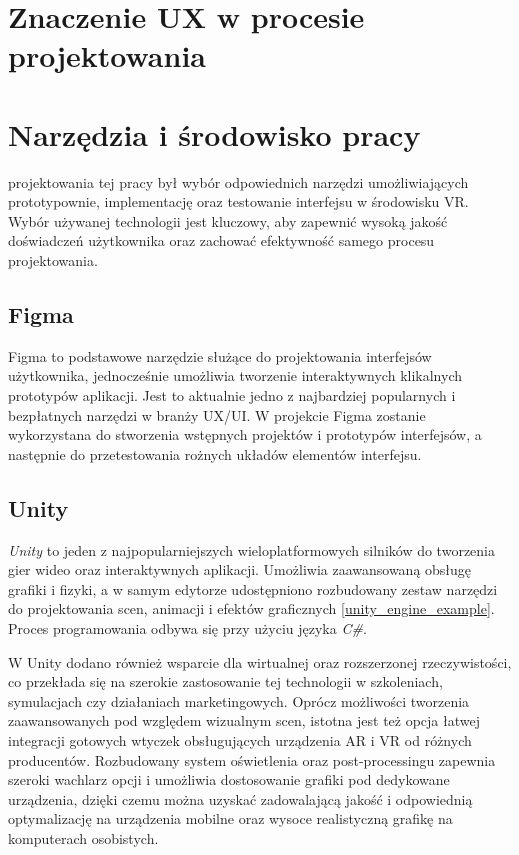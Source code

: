  \section{Znaczenie UX w procesie projektowania}
 



\section {Narzędzia i środowisko pracy}


 projektowania tej pracy był wybór odpowiednich narzędzi umożliwiających prototypownie, implementację oraz testowanie interfejsu w środowisku VR. Wybór używanej technologii jest kluczowy, aby zapewnić wysoką jakość doświadczeń użytkownika oraz zachować efektywność samego procesu projektowania.

\subsection{Figma}
Figma to podstawowe narzędzie służące do projektowania interfejsów użytkownika, jednocześnie umożliwia tworzenie interaktywnych klikalnych prototypów aplikacji. Jest to aktualnie jedno z najbardziej popularnych i bezpłatnych narzędzi w branży UX/UI. W projekcie Figma zostanie wykorzystana do stworzenia wstępnych projektów i prototypów interfejsów, a następnie do przetestowania rożnych układów elementów interfejsu. 
\subsection{Unity}
\textit{Unity} to jeden z najpopularniejszych wieloplatformowych silników do tworzenia gier wideo oraz interaktywnych aplikacji. Umożliwia zaawansowaną obsługę grafiki i fizyki, a w samym edytorze udostępniono rozbudowany zestaw narzędzi do projektowania scen, animacji i efektów graficznych \ref{unity_engine_example}. Proces programowania odbywa się przy użyciu języka \textit{C\#}.

W Unity dodano również wsparcie dla wirtualnej oraz rozszerzonej rzeczywistości, co przekłada się na szerokie zastosowanie tej technologii w szkoleniach, symulacjach czy działaniach marketingowych. Oprócz możliwości tworzenia zaawansowanych pod względem wizualnym scen, istotna jest też opcja łatwej integracji gotowych wtyczek obsługujących urządzenia AR i VR od różnych producentów. Rozbudowany system oświetlenia oraz post-processingu zapewnia szeroki wachlarz opcji i umożliwia dostosowanie grafiki pod dedykowane urządzenia, dzięki czemu można uzyskać zadowalającą jakość i odpowiednią optymalizację na urządzenia mobilne oraz wysoce realistyczną grafikę na komputerach osobistych.

